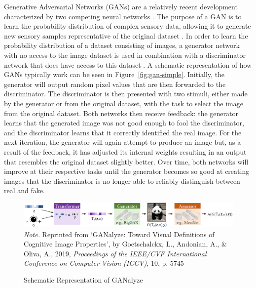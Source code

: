 \documentclass[../main.tex]{subfiles}
\begin{document}
Generative Adversarial Networks (GANs) are a relatively recent development characterized by two competing neural networks \parencite{goodfellow2014generative}. The purpose of a GAN is to learn the probability distribution of complex sensory data, allowing it to generate new sensory samples representative of the original dataset \parencite{goetschalckx2021generative}. In order to learn the probability distribution of a dataset consisting of images, a generator network with no access to the image dataset is used in combination with a discriminator network that does have access to this dataset \parencite{feng2020generative}. A schematic representation of how GANs typically work can be seen in Figure~\ref{fig:gan-simple}. Initially, the generator will output random pixel values that are then forwarded to the discriminator. The discriminator is then presented with two stimuli, either made by the generator or from the original dataset, with the task to select the image from the original dataset. Both networks then receive feedback: the generator learns that the generated image was not good enough to fool the discriminator, and the discriminator learns that it correctly identified the real image. For the next iteration, the generator will again attempt to produce an image but, as a result of the feedback, it has adjusted its internal weights resulting in an output that resembles the original dataset slightly better. Over time, both networks will improve at their respective tasks until the generator becomes so good at creating images that the discriminator is no longer able to reliably distinguish between real and fake.


\begin{figure}[!h]
	\caption{Schematic Representation of GANalyze}
	\label{fig:ganalyze}
	\includegraphics[width=1\linewidth]{images/ganalyze}
	{\textit{Note.} Reprinted from `GANalyze: Toward Visual Definitions of Cognitive Image Properties', by Goetschalckx, L., Andonian, A., \& Oliva, A., 2019, \textit{Proceedings of the IEEE/CVF International Conference on Computer Vision (ICCV)}, 10, p. 5745}
\end{figure}
\end{document}
